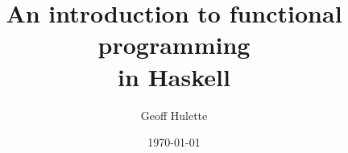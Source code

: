 \documentclass{beamer}
\title{An introduction to functional programming\\in Haskell}
\author{Geoff Hulette}
\date{\today}
\begin{document}
\begin{frame}[plain]
  \titlepage
\end{frame}




\end{document}
